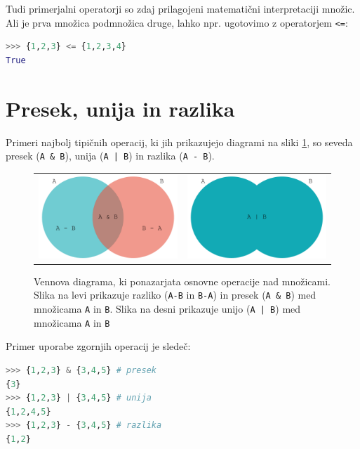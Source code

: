 Tudi primerjalni operatorji so zdaj prilagojeni matematični interpretaciji množic. Ali je prva množica podmnožica druge, lahko npr. ugotovimo z operatorjem \texttt{<=}:
\begin{lstlisting}[language=Python]
>>> {1,2,3} <= {1,2,3,4}
True
\end{lstlisting}

\section{Presek, unija in razlika}

Primeri najbolj tipičnih operacij, ki jih prikazujejo diagrami na sliki \ref{img:mnozice}, so seveda presek (\texttt{A \& B}), unija (\texttt{A | B}) in razlika (\texttt{A - B}).
\begin{figure}
    \centering
    \begin{tabular}{cc}
    \includegraphics[width=0.45\linewidth]{img/mnozice1.pdf} & \includegraphics[width=0.45\linewidth]{img/mnozice2.pdf}\\
    \end{tabular}
    \caption{Vennova diagrama, ki ponazarjata osnovne operacije nad množicami. Slika na levi prikazuje razliko (\texttt{A-B} in \texttt{B-A}) in presek (\texttt{A \& B}) med množicama \texttt{A} in \texttt{B}. Slika na desni prikazuje unijo (\texttt{A | B}) med množicama \texttt{A} in \texttt{B}}
    \label{img:mnozice}
\end{figure}
Primer uporabe zgornjih operacij je sledeč:
\begin{lstlisting}[language=Python]
>>> {1,2,3} & {3,4,5} # presek
{3}
>>> {1,2,3} | {3,4,5} # unija
{1,2,4,5}
>>> {1,2,3} - {3,4,5} # razlika
{1,2}
\end{lstlisting}

